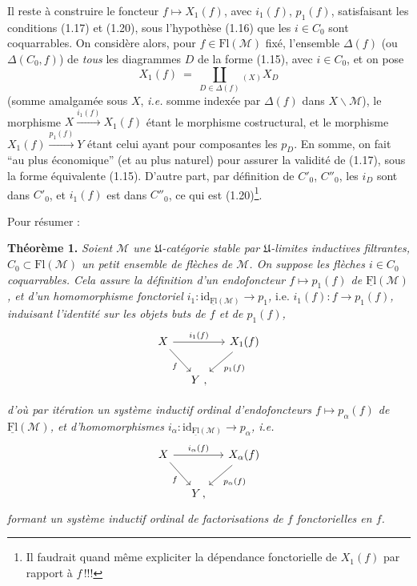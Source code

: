 \documentclass[11pt]{article}
\newcommand{\printedpage}[1]{\marginpar{\footnotesize p.~#1}}
\newcommand{\msp}[1]{\marginpar{\footnotesize [#1]}}
\newcommand{\Fl}{\mathrm{Fl}}
\newcommand{\uFl}{\underline{\mathrm{Fl}}}
\newcommand{\cM}{\mathcal{M}}
\newcommand{\Flu}{\underline{\mathrm{Fl}}}
\newcommand{\fU}{\mathfrak{U}}
\begin{document}
Il reste à construire le foncteur $f \longmapsto X_1(f)$, avec $i_1(f)$, $p_1(f)$, satisfaisant les conditions (1.17) et (1.20), sous l'hypothèse (1.16) que les $i \in C_0$ sont coquarrables. On considère alors, pour $f \in \Fl(\cM)$ fixé, l'ensemble $\Delta(f)$ (ou $\Delta(C_0, f)$) de \textit{tous} les diagrammes $D$ de la forme (1.15), avec $i \in C_0$, et on pose
\[
X_1(f) \ = \ \coprod_{D \in \Delta(f)}{}_{(X)} X_D
\tag*{(1.23)}
\]
(somme amalgamée sous $X$, \textit{i.e.} somme indexée
\msp{page 10}
par $\Delta(f)$ dans $X\backslash\cM$), le morphisme $X \xrightarrow{i_1(f)} X_1(f)$ étant le morphisme costructural, et le morphisme $X_1(f) \xrightarrow{p_1(f)} Y$ étant celui ayant pour composantes les $p_D$. En somme, on fait “au plus économique” (et au plus naturel) pour assurer la validité de (1.17), sous la forme équivalente (1.15). D'autre part, par définition de $C'_0$, $C''_0$, les $i_D$ sont dans $C'_0$, et $i_1(f)$ est dans $C''_0$, ce qui est (1.20)\footnote{Il faudrait quand même expliciter la dépendance fonctorielle de $X_1(f)$ par rapport à $f$\,!!!}.

Pour résumer :

\textbf{Théorème 1.} \textit{Soient $\cM$ une $\fU$-catégorie stable par $\fU$-limites inductives filtrantes, $C_0 \subset \Fl(\cM)$ un petit ensemble de flèches de $\cM$. On suppose les flèches $i \in C_0$ coquarrables. Cela assure la définition d'un endofoncteur $f \longmapsto p_1(f)$ de $\Flu(\cM)$, et d'un homomorphisme fonctoriel $i_1 : \mathrm{id}_{\Flu(\cM)} \longrightarrow p_1$,} i.e. \textit{$i_1(f) : f \longrightarrow p_1(f)$, induisant l'identité sur les objets buts de $f$ et de $p_1(f)$,}
\[
\begin{tikzcd}[column sep=small]
X \arrow[rr, "i_1(f)"] \arrow[dr, "f"'] & & X_1(f) \arrow[dl, "p_1(f)"] \\
 & Y \ , &
\end{tikzcd}
\]

\printedpage{9}

{\itshape d'où par itération un système inductif ordinal d'endofoncteurs $f\longmapsto p_\alpha(f)$ de $\uFl(\cM)$, et d'homomorphismes $i_\alpha : \mathrm{id}_{\uFl(\cM)} \longrightarrow p_\alpha$, \textup{i.e.}}
\[
\begin{tikzcd}[column sep=small]
X \arrow[rr, "i_\alpha(f)"] \arrow[dr, "f"'] & & X_\alpha(f) \arrow[dl, "p_\alpha(f)"] \\
& Y\,, &
\end{tikzcd}
\]
{\itshape formant un système inductif ordinal de factorisations de $f$ fonctorielles en $f$.}
\end{document}
